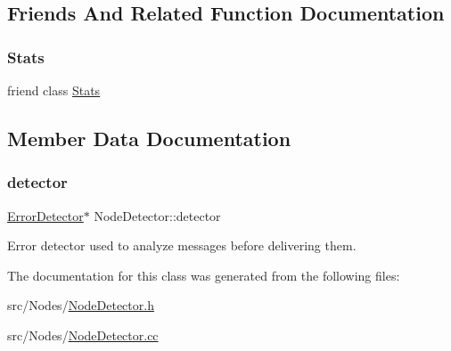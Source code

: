 \subsection{Friends And Related Function Documentation}
\mbox{\label{class_node_detector_a129f65b6976377739eb6231b6962985e}} 
\subsubsection{\texorpdfstring{Stats}{Stats}}
{\footnotesize\ttfamily friend class \hyperlink{class_stats}{Stats}\hspace{0.3cm}{\ttfamily [friend]}}



\subsection{Member Data Documentation}
\mbox{\label{class_node_detector_a711fd643dc29b74e6dfe87e1aeb1b227}} 
\subsubsection{\texorpdfstring{detector}{detector}}
{\footnotesize\ttfamily \hyperlink{class_error_detector}{Error\+Detector}$\ast$ Node\+Detector\+::detector\hspace{0.3cm}{\ttfamily [protected]}}



Error detector used to analyze messages before delivering them. 



The documentation for this class was generated from the following files\+:\begin{DoxyCompactItemize}
\item 
src/\+Nodes/\hyperlink{_node_detector_8h}{Node\+Detector.\+h}\item 
src/\+Nodes/\hyperlink{_node_detector_8cc}{Node\+Detector.\+cc}\end{DoxyCompactItemize}
